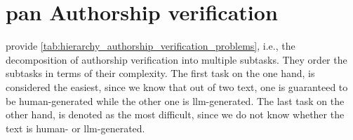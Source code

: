 \section{\acs{pan} Authorship verification}
\label{sec:pan_authorship_verification}

\citet{ayele_overview_nodate} provide \autoref{tab:hierarchy_authorship_verification_problems}, i.e., 
the decomposition of authorship verification into multiple subtasks. 
They order the subtasks in terms of their complexity.
The first task on the one hand, is considered the easiest, since we know that out of two text, one is guaranteed to be human-generated while the other one is \ac{llm}-generated.
The last task on the other hand, is denoted as the most difficult, since we do not know whether the text is human- or \ac{llm}-generated.


\begin{table}[tbp]
    \centering
    \caption{Hierarchy of authorship verification problems from easiest (1) to most difficult (7), 
    where A, B corresponds to human-authored text and M denotes \ac{llm}-generated text.}
    \label{tab:hierarchy_authorship_verification_problems}
    \end{table}